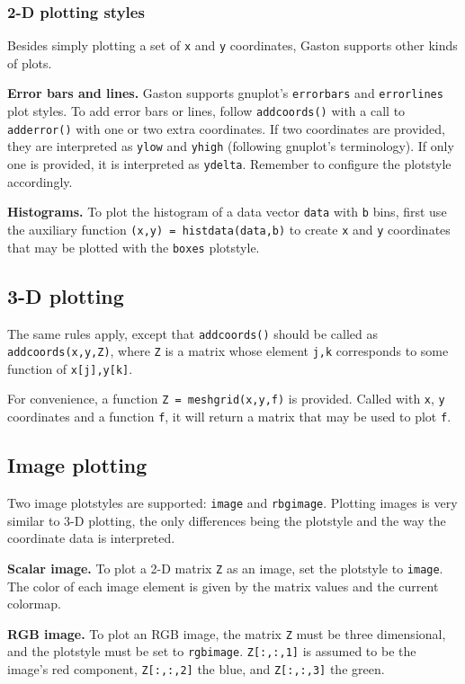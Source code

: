 \documentclass[11pt]{article}
\newcommand{\cmd}[1]{\texttt{#1}}
\begin{document}
\subsubsection{2-D plotting styles}

Besides simply plotting a set of \cmd{x} and \cmd{y} coordinates, Gaston
supports other kinds of plots.

\textbf{Error bars and lines.} Gaston supports gnuplot's \cmd{errorbars} and
\cmd{errorlines} plot styles. To add error bars or lines, follow
\cmd{addcoords()} with a call to \cmd{adderror()} with one or two extra
coordinates. If two coordinates are provided, they are interpreted as \cmd{ylow}
and \cmd{yhigh} (following gnuplot's terminology). If only one is provided, it
is interpreted as \cmd{ydelta}. Remember to configure the plotstyle
accordingly.

\textbf{Histograms.} To plot the histogram of a data vector \cmd{data} with
\cmd{b} bins, first use the auxiliary function \cmd{(x,y) = histdata(data,b)}
to create \cmd{x} and \cmd{y} coordinates that may be plotted with the
\cmd{boxes} plotstyle.

\subsection{3-D plotting}

The same rules apply, except that \cmd{addcoords()} should be called as
\cmd{addcoords(x,y,Z)}, where \cmd{Z} is a matrix whose element \cmd{j,k}
corresponds to some function of \cmd{x[j],y[k]}.

For convenience, a function \cmd{Z = meshgrid(x,y,f)} is provided. Called with
\cmd{x}, \cmd{y} coordinates and a function \cmd{f}, it will return a matrix
that may be used to plot \cmd{f}.

\subsection{Image plotting}

Two image plotstyles are supported: \cmd{image} and \cmd{rbgimage}. Plotting
images is very similar to 3-D plotting, the only differences being the
plotstyle and the way the coordinate data is interpreted.

\textbf{Scalar image.} To plot a 2-D matrix \cmd{Z} as an image, set the
plotstyle to \cmd{image}. The color of each image element is given by the
matrix values and the current colormap.

\textbf{RGB image.} To plot an RGB image, the matrix \cmd{Z} must be three
dimensional, and the plotstyle must be set to \cmd{rgbimage}.  \cmd{Z[:,:,1]}
is assumed to be the image's red component, \cmd{Z[:,:,2]} the blue, and
\cmd{Z[:,:,3]} the green.
\end{document}

